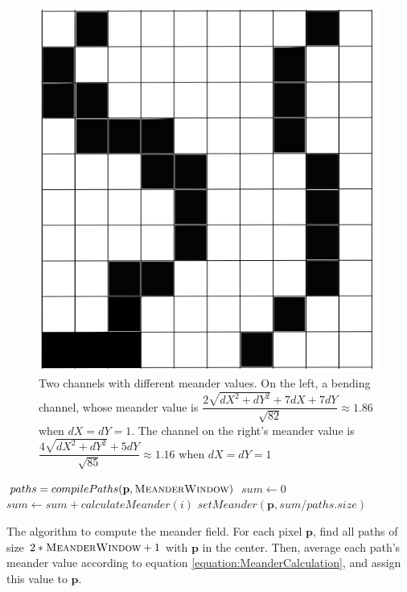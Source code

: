 \begin{figure}[t]
\begin{minipage}[b]{0.9\linewidth}
\begin{center}
\includegraphics[width=0.5\linewidth]{images/Meander.png}
\end{center}
\end{minipage}
\caption[Two channels with different meander values]{\label{figure:2DMeanderVisualization} Two channels with different meander values. On the left, a bending channel, whose meander value is $\dfrac{2\sqrt{dX^2 + dY^2} + 7dX + 7dY}{\sqrt{82}} \approx 1.86$ when $dX = dY = 1$. The channel on the right's meander value is $\dfrac{4\sqrt{dX^2 + dY^2} + 5dY}{\sqrt{85}}\approx 1.16$ when $dX = dY = 1$ }
\end{figure}

\begin{algorithm}[t]
\begin{algorithmic}
    \STATE $paths = compilePaths( \textbf{p}, \textsc{MeanderWindow} )$
    \STATE $sum \gets 0$
      \STATE $sum \gets sum + calculateMeander( i )$
    \ENDFOR
    \STATE $setMeander( \textbf{p}, sum / paths.size )$
  \ENDFOR
\end{algorithmic}
\caption[Algorithm to compute the meander field]{\label{algorithm:PixelMeanderValues}The algorithm to compute the meander field. For each pixel $\textbf{p}$, find all paths of size $2 * \textsc{MeanderWindow} + 1$ with $\textbf{p}$ in the center. Then, average each path's meander value according to equation \ref{equation:MeanderCalculation}, and assign this value to $\textbf{p}$.}
\end{algorithm}

